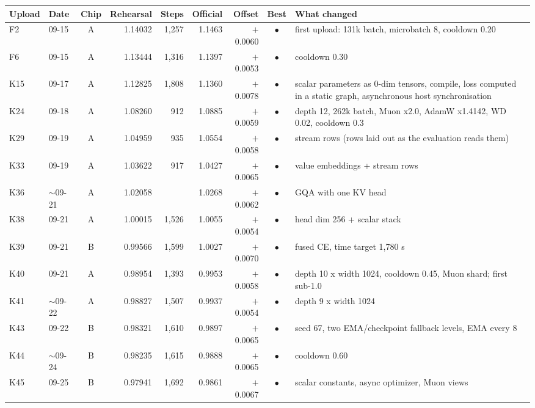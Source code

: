 {\scriptsize\setlength{\tabcolsep}{3pt}
\begin{tabular}{@{}llcrrrrcp{7.9cm}@{}}
\toprule
Upload & Date & Chip & Rehearsal & Steps & Official & Offset & Best & What changed \\
\midrule
F2 & 09-15 & A & 1.14032 & 1{,}257 & 1.1463 & \ensuremath{+}0.0060 & $\bullet$ & first upload: 131k batch, microbatch 8, cooldown 0.20 \\
F6 & 09-15 & A & 1.13444 & 1{,}316 & 1.1397 & \ensuremath{+}0.0053 & $\bullet$ & cooldown 0.30 \\
K15 & 09-17 & A & 1.12825 & 1{,}808 & 1.1360 & \ensuremath{+}0.0078 & $\bullet$ & scalar parameters as 0-dim tensors, compile, loss computed in a static graph, asynchronous host synchronisation \\
K24 & 09-18 & A & 1.08260 & 912 & 1.0885 & \ensuremath{+}0.0059 & $\bullet$ & depth 12, 262k batch, Muon x2.0, AdamW x1.4142, WD 0.02, cooldown 0.3 \\
K29 & 09-19 & A & 1.04959 & 935 & 1.0554 & \ensuremath{+}0.0058 & $\bullet$ & stream rows (rows laid out as the evaluation reads them) \\
K33 & 09-19 & A & 1.03622 & 917 & 1.0427 & \ensuremath{+}0.0065 & $\bullet$ & value embeddings + stream rows \\
K36 & $\sim$09-21 & A & 1.02058 &  & 1.0268 & \ensuremath{+}0.0062 & $\bullet$ & GQA with one KV head \\
K38 & 09-21 & A & 1.00015 & 1{,}526 & 1.0055 & \ensuremath{+}0.0054 & $\bullet$ & head dim 256 + scalar stack \\
K39 & 09-21 & B & 0.99566 & 1{,}599 & 1.0027 & \ensuremath{+}0.0070 & $\bullet$ & fused CE, time target 1,780 s \\
K40 & 09-21 & A & 0.98954 & 1{,}393 & 0.9953 & \ensuremath{+}0.0058 & $\bullet$ & depth 10 x width 1024, cooldown 0.45, Muon shard; first sub-1.0 \\
K41 & $\sim$09-22 & A & 0.98827 & 1{,}507 & 0.9937 & \ensuremath{+}0.0054 & $\bullet$ & depth 9 x width 1024 \\
K43 & 09-22 & B & 0.98321 & 1{,}610 & 0.9897 & \ensuremath{+}0.0065 & $\bullet$ & seed 67, two EMA/checkpoint fallback levels, EMA every 8 \\
K44 & $\sim$09-24 & B & 0.98235 & 1{,}615 & 0.9888 & \ensuremath{+}0.0065 & $\bullet$ & cooldown 0.60 \\
K45 & 09-25 & B & 0.97941 & 1{,}692 & 0.9861 & \ensuremath{+}0.0067 & $\bullet$ & scalar constants, async optimizer, Muon views \\

\end{tabular}}

